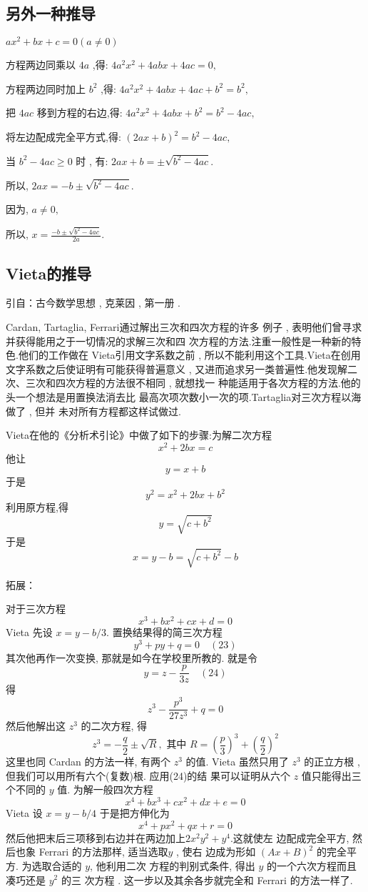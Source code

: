 \subsection{另外一种推导}
$a x^{2}+b x+c=0(a \neq 0)$

方程两边同乘以 $4a$ ,得: $4a^{2} x^{2}+4 abx+4 ac=0,$

方程两边同时加上 $b^{2}$ ,得: $4 a^{2} x^{2}+4 abx+4ac+b^{2}=b^{2},$

把 $4 a c$ 移到方程的右边,得: $4a^{2} x^{2}+4abx+b^{2}=b^{2}-4ac,$

将左边配成完全平方式,得: $(2 a x+b)^{2}=b^{2}-4 a c,$

当 $b^{2}-4ac \geq 0$ 时 , 有:
$2 a x+b=\pm \sqrt{b^{2}-4 a c}.$

所以, $2 ax=-b \pm \sqrt{b^{2}-4 a c}.$

因为, $a \neq 0,$

所以, $x=\frac{-b \pm \sqrt{b^2-4 a c}}{2 a}.$

\subsection{Vieta的推导}
引自：古今数学思想 , 克莱因 , 第一册 . 

Cardan, Tartaglia, Ferrari通过解出三次和四次方程的许多 例子 , 表明他们曾寻求并获得能用之于一切情况的求解三次和四 次方程的方法.注重一般性是一种新的特色.他们的工作做在 Vieta引用文字系数之前 , 所以不能利用这个工具.Vieta在创用 文字系数之后使证明有可能获得普遍意义 , 又进而追求另一类普遍性.他发现解二次、三次和四次方程的方法很不相同 , 就想找一 种能适用于各次方程的方法.他的头一个想法是用置换法消去比 最高次项次数小一次的项.Tartaglia对三次方程以海做了 , 但并 未对所有方程都这样试做过.

Vieta在他的《分析术引论》中做了如下的步骤:为解二次方程
\[
x^{2}+2 b x=c
\]
他让
\[
y=x+b
\]
于是
\[
y^{2}=x^{2}+2 b x+b^{2}
\]
利用原方程,得
\[
y=\sqrt{c+b^{2}}
\]
于是
\[
x=y-b=\sqrt{c+b^{2}}-b
\]

拓展：

对于三次方程
\[
x^{3}+b x^{2}+c x+d=0
\]
Vieta 先设 $x=y-b / 3 .$ 置换结果得的简三次方程
\[
y^{3}+p y+q=0 \quad (23)
\]
其次他再作一次变换, 那就是如今在学校里所教的. 就是令
\[
y=z-\frac{p}{3 z} \quad (24)
\]
得
\[
z^{3}-\frac{p^{3}}{27 z^{3}}+q=0
\]
然后他解出这 $z^{3}$ 的二次方程, 得
\[
z^{3}=-\frac{q}{2} \pm \sqrt{R}, \text { 其中 } R=\left(\frac{p}{3}\right)^{3}+\left(\frac{q}{2}\right)^{2}
\]
这里也同 Cardan 的方法一样, 有两个 $z^{3}$ 的值. Vieta 虽然只用了
$z^{3}$ 的正立方根 , 但我们可以用所有六个(复数)根. 应用(24)的结
果可以证明从六个 $z$ 值只能得出三个不同的 $y$ 值.
为解一般四次方程
\[
x^{4}+b x^{3}+c x^{2}+d x+e=0
\]
Vieta 设 $x=y-b / 4$ 于是把方伸化为
\[
x^{4}+p x^{2}+q x+r=0
\]
然后他把末后三项移到右边并在两边加上$2x^2y^2+y^4$.这就使左
边配成完全平方, 然后也象 Ferrari 的方法那样, 适当选取$y$ , 使右
边成为形如 $(A x+B)^{2}$ 的完全平方. 为选取合适的 $y$, 他利用二次
方程的判别式条件, 得出 $y$ 的一个六次方程而且凑巧还是 $y^{2}$ 的三 次方程 . 这一步以及其余各步就完全和 Ferrari 的方法一样了.

